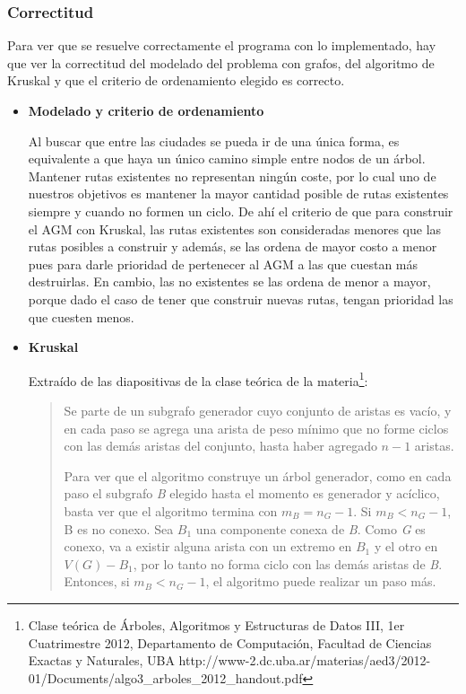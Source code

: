 \subsubsection{Correctitud}

\quad Para ver que se resuelve correctamente el programa con lo implementado, hay que ver la correctitud del modelado del problema con grafos, del algoritmo de Kruskal y que el criterio de ordenamiento elegido es correcto.

\begin{itemize}


\item \textbf{Modelado y criterio de ordenamiento}

\quad Al buscar que entre las ciudades se pueda ir de una \'unica forma, es equivalente a que haya un \'unico camino simple entre nodos de un \'arbol.  Mantener rutas existentes no representan ningún coste, por lo cual uno de nuestros objetivos es mantener la mayor cantidad posible de rutas existentes siempre y cuando no formen un ciclo. De ahí el criterio de que para construir el AGM con Kruskal, las rutas existentes son consideradas menores que las rutas posibles a construir y además, se las ordena de mayor costo a menor pues para darle prioridad de pertenecer al AGM a las que cuestan más destruirlas. En cambio, las no existentes se las ordena de menor a mayor, porque dado el caso de tener que construir nuevas rutas, tengan prioridad las que cuesten menos.

\quad

\quad

\item \textbf{Kruskal}

\quad Extra\'ido de las diapositivas de la clase te\'orica de la materia\footnote{Clase teórica de Árboles, Algoritmos y Estructuras de Datos III, 1er Cuatrimestre 2012, Departamento de Computación, Facultad de Ciencias Exactas y Naturales, UBA http://www-2.dc.uba.ar/materias/aed3/2012-01/Documents/algo3\_arboles\_2012\_handout.pdf}:

\begin{quotation}
 

\quad Se parte de un subgrafo generador cuyo conjunto de aristas es vac\'io, y en cada paso se agrega una arista de peso m\'inimo que no forme ciclos con 
las dem\'as aristas del conjunto, hasta haber agregado $n - 1$ aristas.

\quad Para ver que el algoritmo construye un \'arbol generador, como en cada paso el subgrafo \textit{B} elegido hasta el momento es generador y ac\'iclico,
basta ver que el algoritmo termina con $ m_B  =  n_G - 1$. Si $ m_B < n_G - 1$, B es no conexo. Sea $ B_1 $ una componente conexa de \textit{B}. Como \textit{G} es conexo, va a existir alguna arista con un extremo en $ B_1 $ y el otro en $ V(G) - B_1 $, por lo tanto no forma ciclo con las dem\'as aristas de \textit{B}. Entonces, si $ m_B < n_G - 1$, el algoritmo puede realizar un paso m\'as.


\end{quotation}
\end{itemize}
